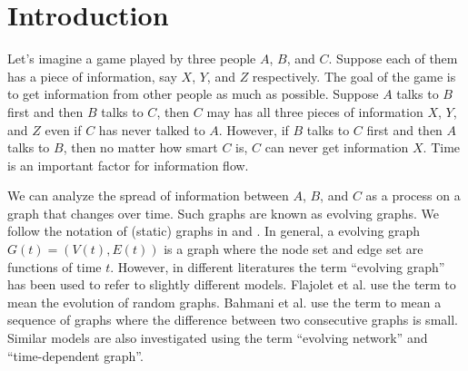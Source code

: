 \documentclass[11pt, conference, , compsocconf]{IEEEtran}
\theoremstyle{definition}
\begin{document}
\section{Introduction}

Let's imagine a game played by three people
$A$, $B$, and $C$. Suppose each of them has a piece of information,
say $X$, $Y$, and $Z$ respectively. The goal of the game is 
to get information from other people as much as possible. 
Suppose $A$ talks to $B$ first and then $B$ talks to $C$, 
then $C$ may has all three pieces of information $X$, $Y$, and $Z$ even 
if $C$ has never talked to $A$. 
However, if $B$ talks to $C$ first and then $A$ talks to $B$, then
no matter how smart $C$ is, $C$ can never get information 
$X$.  Time is an important factor for information flow. 
 
We can analyze the spread of information between $A$, $B$, and $C$
as a process on a graph that changes over time.  
Such graphs are known as evolving graphs.
We follow the notation of (static) graphs in  \cite{even12} and \cite{kegi11}.
In general, a evolving graph $G(t) = (V(t), E(t))$ is  a graph where the node set
and edge set are functions of time $t$.
However, in different literatures the term ``evolving graph'' has been
used to refer to slightly different models. 
 Flajolet et al. \cite{fkp89} use the term to mean the evolution of random graphs.
Bahmani et al. \cite{bkmu12} use the term to mean a sequence of graphs where
the difference between two consecutive graphs is small.
Similar models are also investigated using the term ``evolving network'' and 
``time-dependent graph''. 
\end{document}
